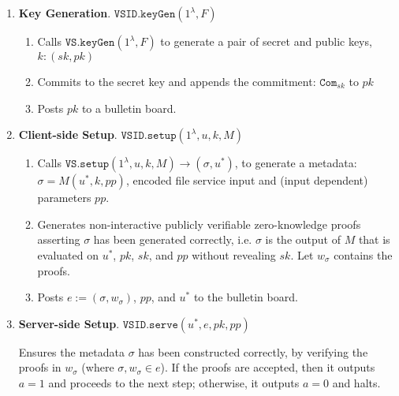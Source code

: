 

\begin{enumerate}
\item\textbf{Key Generation}\label{VSID::keygen}. $\mathtt{VSID.keyGen}(1^{\lambda},F)$ 
\begin{enumerate}
\item Calls  $\mathtt{VS.keyGen}(1^{\lambda},F)$ to generate a pair of secret and public keys, $k:(sk,pk)$
\item Commits to the secret key and appends the commitment: $\mathtt{Com}_{\scriptscriptstyle sk}$ to $pk$
\item Posts $pk$ to a bulletin board. %
\end{enumerate}

\item\textbf{Client-side Setup}\label{VSID::Client-side-Setup}. $\mathtt{VSID.setup}(1^{\lambda}, u,k,M)$
\begin{enumerate}
\item Calls  $\mathtt{VS.setup}(1^{\lambda}, u,k,M)\rightarrow (\sigma,u^{\scriptscriptstyle *})$, to generate a   metadata: $\sigma=M(u^{\scriptscriptstyle *},k,{pp})$, encoded file service input and { (input dependent) parameters $pp$}. %


\item Generates non-interactive publicly verifiable zero-knowledge proofs asserting  $\sigma$ has been generated correctly, i.e. $\sigma$ is the output of  $M$ that is evaluated on $u^{\scriptscriptstyle *}$, $pk$,  $sk$, and {$pp$} without revealing $sk$. Let $w_{\scriptscriptstyle\sigma}$ contains the proofs.
\item\label{vsid::post-metadata} Posts $ e:=(\sigma,w_{\scriptscriptstyle\sigma})$, {$pp$},  and $u^{\scriptscriptstyle *}$ to the bulletin board. 
\end{enumerate}

\item\textbf{Server-side Setup}. $\mathtt{VSID.serve}(u^{\scriptscriptstyle *},e,pk,{pp})$

Ensures the metadata $\sigma$ has been constructed correctly, by verifying the proofs in $w_{\sigma}$ (where $\sigma,w_{\scriptscriptstyle\sigma}\in e$). If the proofs are accepted, then it outputs $a=1$  and proceeds to the next step; otherwise, it outputs $a=0$ and halts. 


\end{enumerate}
